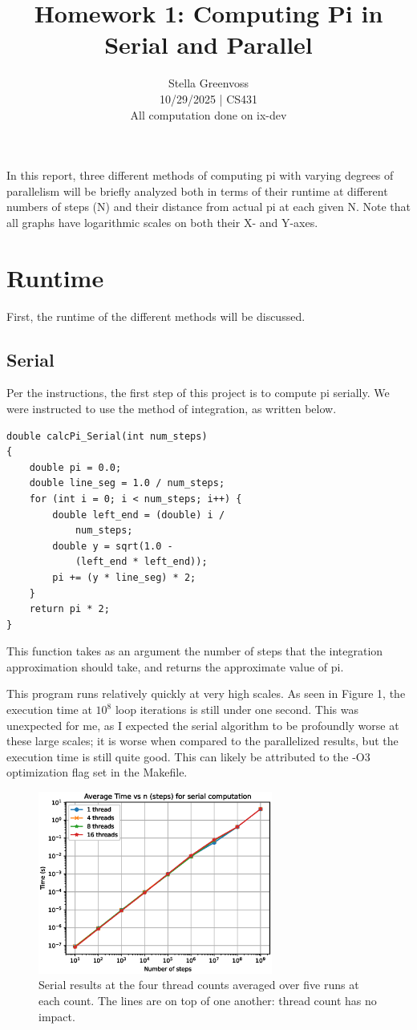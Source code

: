 \documentclass[a4paper]{article}
\title{Homework 1: Computing Pi in Serial and Parallel}
\author{
Stella Greenvoss \\ 
10/29/2025 | CS431\\
All computation done on ix-dev
}
\begin{document}
\maketitle

In this report, three different methods of computing pi with varying degrees of parallelism will be briefly analyzed both in terms of their runtime at different numbers of steps (N) and their distance from actual pi at each given N. Note that all graphs have logarithmic scales on both their X- and Y-axes.
\section{Runtime}
First, the runtime of the different methods will be discussed.
\subsection{Serial}
Per the instructions, the first step of this project is to compute pi serially. We were instructed to use the method of integration, as written below.
\begin{verbatim}
double calcPi_Serial(int num_steps)
{
    double pi = 0.0;
    double line_seg = 1.0 / num_steps;
    for (int i = 0; i < num_steps; i++) {
        double left_end = (double) i / 
            num_steps;
        double y = sqrt(1.0 - 
            (left_end * left_end));
        pi += (y * line_seg) * 2;	
    }
    return pi * 2;
}
\end{verbatim}
This function takes as an argument the number of steps that the integration approximation should take, and returns the approximate value of pi.

This program runs relatively quickly at very high scales. As seen in Figure 1, the execution time at $10^8$ loop iterations is still under one second. This was unexpected for me, as I expected the serial algorithm to be profoundly worse at these large scales; it is worse when compared to the parallelized results, but the execution time is still quite good. This can likely be attributed to the -O3 optimization flag set in the Makefile. 

\begin{figure}[ht]
\begin{center}
\includegraphics[height=6cm]{fig_serial.eps}
\caption{Serial results at the four thread counts averaged over five runs at each count. The lines are on top of one another: thread count has no impact.}
\label{fig1}
\end{center}
\end{figure}
\end{document}
